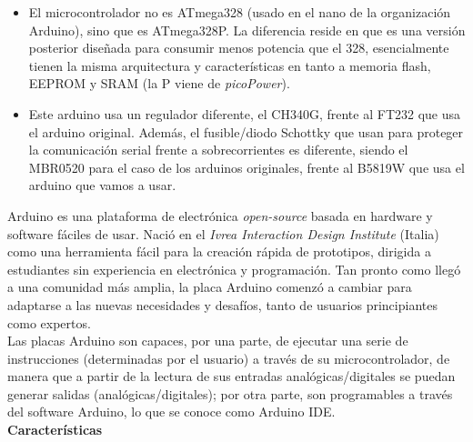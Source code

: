 \documentclass[12pt]{article}
\begin{document}
	\begin{itemize}
		\item El microcontrolador no es ATmega328 (usado en el nano de la organización Arduino), sino que es ATmega328P. La diferencia reside en que es una versión posterior diseñada para consumir menos potencia que el 328, esencialmente tienen la misma arquitectura y características en tanto a memoria flash, EEPROM y SRAM (la P viene de \textit{picoPower}).
		\item Este arduino usa un regulador diferente, el CH340G, frente al FT232 que usa el arduino original. Además, el fusible/diodo Schottky que usan para proteger la comunicación serial frente a sobrecorrientes es diferente, siendo el MBR0520 para el caso de los arduinos originales, frente al B5819W que usa el arduino que vamos a usar.
	\end{itemize}
	
	\noindent Arduino es una plataforma de electrónica \textit{open-source} basada en hardware y software fáciles de usar. Nació en el \textit{Ivrea Interaction Design Institute} (Italia) como una herramienta fácil para la creación rápida de prototipos, dirigida a estudiantes sin experiencia en electrónica y programación. Tan pronto como llegó a una comunidad más amplia, la placa Arduino comenzó a cambiar para adaptarse a las nuevas necesidades y desafíos, tanto de usuarios principiantes como expertos. \\
	
	\noindent Las placas Arduino son capaces, por una parte, de ejecutar una serie de instrucciones (determinadas por el usuario) a través de su microcontrolador, de manera que a partir de la lectura de sus entradas analógicas/digitales se puedan generar salidas (analógicas/digitales); por otra parte, son programables a través del software Arduino, lo que se conoce como Arduino IDE. \\
	
	\noindent \textbf{Características} \\
	
\end{document}
